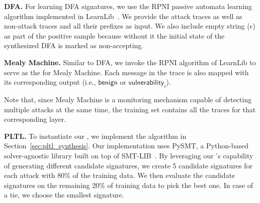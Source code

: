 \textbf{DFA.} For learning DFA signatures, we use the RPNI passive automata learning algorithm implemented in LearnLib~\cite{learnlib}.
We provide the attack traces as well as non-attack traces and all their prefixes as input. We also include empty string ($\epsilon$) as part of the positive
sample because without it the initial state of the synthesized DFA is marked as non-accepting.


\textbf{Mealy Machine.} Similar to DFA, we invoke the RPNI algorithm of LearnLib \cite{learnlib} to serve as the \signatureSynthesizer for
Mealy Machine. Each message in the trace is also mapped with its corresponding output (i.e., $\mathsf{benign}$ or $\mathsf{vulnerability}_i$).

Note that, since Mealy Machine is a monitoring mechanism capable of detecting multiple attacks at the same time, the training set
contains all the traces for that corresponding layer.

\textbf{PLTL.} To instantiate our \pltl \signatureSynthesizer, we implement the algorithm  in Section~\ref{sec:pltl_synthesis}.
Our implementation uses PySMT, a Python-based solver-agnostic library
built on top of SMT-LIB~\cite{smtlib}. %
By leveraging our \pltl \signatureSynthesizer's capability of
generating different candidate signatures, we create 5
candidate signatures
for each attack with 80\% of the training data. We then evaluate the candidate
signatures on the remaining 20\% of training data to pick the best one.
In case of a tie, we choose the smallest signature.
